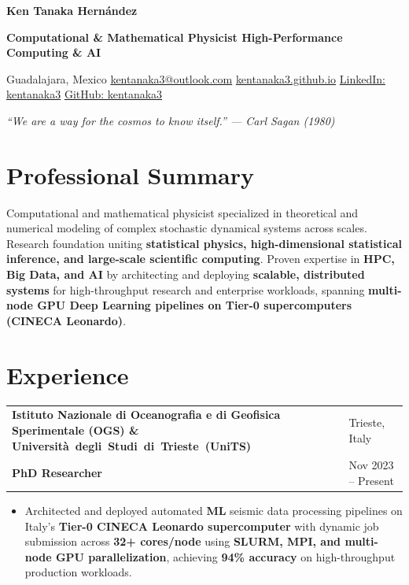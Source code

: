 \documentclass[10pt,a4paper]{article}
\makeatletter
\newcommand{\contactsep}{\hspace{0.55em}{\color{rule}\textbar}\hspace{0.55em}}
\newenvironment{cvbullets}{
  \begin{itemize}[
        leftmargin=1.2em,
        label=\textcolor{accent}{\footnotesize\textbullet},
        itemsep=1.5pt,
        topsep=2pt,
        parsep=0pt,
        partopsep=0pt
      ]
    }{
  \end{itemize}
}
\newcommand{\cventry}[4]{%
  \vspace{2pt}%
  \begin{tabularx}{\textwidth}{@{}X>{\raggedleft\arraybackslash}p{1.55in}@{}}
    {\bfseries\color{ink}#1} & {\small\color{muted}#3}\\[-1pt]
    {\bfseries\color{accent}#2} & {\small\color{muted}#4}
  \end{tabularx}%
  \vspace{-1pt}%
}
\newcommand{\cvepigraph}[1]{%
  \begin{flushright}
    \itshape #1
  \end{flushright}
}
\makeatother
\begin{document}
\begin{center}
  {\fontsize{25}{29}\selectfont\bfseries\color{ink}Ken Tanaka Hernández}\par
  \vspace{7pt}
  {\large\bfseries\color{accent}Computational \& Mathematical Physicist
    \textbar{} High-Performance Computing \& AI
  }\par
  \vspace{7pt}
  {\small\color{muted}
    Guadalajara, Mexico
    \contactsep
    \href{mailto:kentanaka3@outlook.com}{kentanaka3@outlook.com}
    \contactsep
    \href{https://kentanaka3.github.io}{kentanaka3.github.io}
    \contactsep
    \href{https://www.linkedin.com/in/kentanaka3}{LinkedIn: kentanaka3}
    \contactsep
    \href{https://github.com/kentanaka3}{GitHub: kentanaka3}
  }\par
\end{center}

\cvepigraph{``We are a way for the cosmos to know itself.'' --- Carl Sagan
(1980)}

\section*{Professional Summary}
Computational and mathematical physicist specialized in theoretical and
numerical modeling of complex stochastic dynamical systems across scales.
Research foundation uniting \textbf{statistical physics, high-dimensional
statistical inference, and large-scale scientific computing}. Proven expertise
in \textbf{HPC, Big Data, and AI} by architecting and deploying
\textbf{scalable, distributed systems} for high-throughput research and
enterprise workloads, spanning \textbf{multi-node GPU Deep Learning pipelines
on Tier-0 supercomputers (CINECA Leonardo)}.

\section*{Experience}

\cventry{Istituto Nazionale di Oceanografia e di Geofisica Sperimentale (OGS)
\& \mbox{Università degli Studi di Trieste (UniTS)}}{PhD Researcher}
{Trieste, Italy}{Nov 2023 -- Present}
\begin{cvbullets}
\item Architected and deployed automated \textbf{ML} seismic data processing
  pipelines on Italy's \textbf{Tier-0 CINECA Leonardo supercomputer} with
  dynamic job submission across \textbf{32+ cores/node} using \textbf{SLURM,
  MPI, and multi-node GPU parallelization}, achieving \textbf{94\% accuracy} on
  high-throughput production workloads.
\end{cvbullets}
\end{document}
